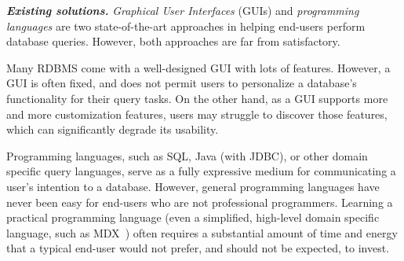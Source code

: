 









\vspace{1mm}
\noindent \textbf{\textit{Existing solutions.}}
\textit{Graphical User Interfaces} (GUIs) and \textit{programming languages}
are two state-of-the-art approaches in helping end-users perform
database queries. However, both approaches are far from satisfactory.

Many RDBMS come with a well-designed GUI with lots of features.
However, 
a GUI is often fixed, and does not permit users to personalize
a database's functionality for their query tasks. On the other hand,
as a GUI supports more and more customization features, users
may struggle to discover those features, which can significantly
degrade its usability. 

Programming languages, such as SQL,
Java (with JDBC), or other domain specific query languages, 
serve as a fully expressive medium  for
communicating a user's intention to a database. However, 
general programming languages have never been easy for
end-users who are not professional programmers.  Learning
a practical programming language (even a simplified, high-level domain
specific language, such as MDX~\cite{mdx}) often requires a substantial amount
of time and energy that a typical end-user would not prefer,
and should not be expected, to invest. 



